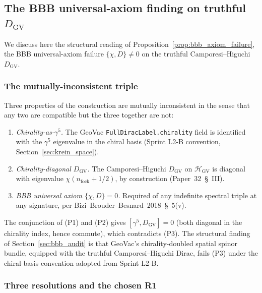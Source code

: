 \documentclass[11pt,a4paper]{article}
\theoremstyle{plain}
\theoremstyle{definition}
\newcommand{\Hilb}{\mathcal{H}}
\newcommand{\DGV}{D_{\mathrm{GV}}}
\begin{document}
\subsection{The BBB universal-axiom finding on truthful $\DGV$}
\label{sec:bbb_axiom_finding}

We discuss here the structural reading of
Proposition~\ref{prop:bbb_axiom_failure}, the BBB universal-axiom
failure $\{\chi, D\} \ne 0$ on the truthful Camporesi--Higuchi $\DGV$.

\subsubsection{The mutually-inconsistent triple}

Three properties of the construction are mutually inconsistent in the
sense that any two are compatible but the three together are not:
\begin{enumerate}\setlength{\itemsep}{2pt}
\item[(P1)] \emph{Chirality-as-$\gamma^5$.} The GeoVac
\texttt{FullDiracLabel.chirality} field is identified with the $\gamma^5$
eigenvalue in the chiral basis (Sprint L2-B convention,
Section~\ref{sec:krein_space}).
\item[(P2)] \emph{Chirality-diagonal $\DGV$.} The Camporesi--Higuchi
$\DGV$ on $\Hilb_{\mathrm{GV}}$ is diagonal with eigenvalue
$\chi(n_\text{fock} + 1/2)$, by construction
(Paper~32~\S~III).
\item[(P3)] \emph{BBB universal axiom $\{\chi, D\} = 0$.} Required of
any indefinite spectral triple at any signature, per
Bizi--Brouder--Besnard~2018~\S~5(v).
\end{enumerate}
The conjunction of (P1) and (P2) gives $[\gamma^5, \DGV] = 0$ (both
diagonal in the chirality index, hence commute), which contradicts
(P3). The structural finding of Section~\ref{sec:bbb_audit} is that
GeoVac's chirality-doubled spatial spinor bundle, equipped with the
truthful Camporesi--Higuchi Dirac, fails (P3) under the chiral-basis
convention adopted from Sprint L2-B.

\subsubsection{Three resolutions and the chosen R1}
\end{document}
